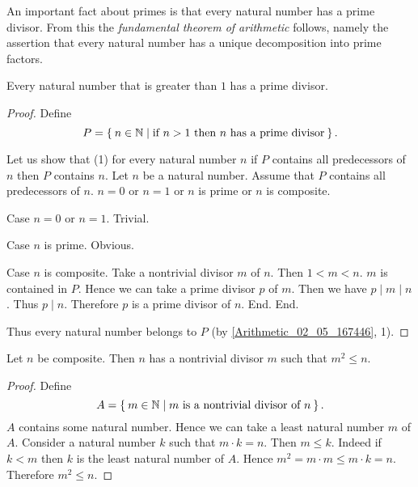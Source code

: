 \documentclass[../../arithmetic.ftl.tex]{subfiles}
\begin{document}
  An important fact about primes is that every natural number has a prime
  divisor. From this the \textit{fundamental theorem of arithmetic} follows,
  namely the assertion that every natural number has a unique decomposition
  into prime factors.

  \begin{forthel}
    \begin{proposition}\label{Arithmetic_03_04_130748}
      Every natural number that is greater than $1$ has a prime divisor.
    \end{proposition}
    \begin{proof}
      Define \[ P = \Set{n \in \mathbb{N} | \text{if $n > 1$ then $n$ has a prime divisor}}. \]

      Let us show that (1) for every natural number $n$ if $P$ contains all predecessors of $n$ then $P$ contains $n$.
        Let $n$ be a natural number.
        Assume that $P$ contains all predecessors of $n$.
        $n = 0$ or $n = 1$ or $n$ is prime or $n$ is composite.

        Case $n = 0$ or $n = 1$. Trivial.

        Case $n$ is prime. Obvious.

        Case $n$ is composite.
          Take a nontrivial divisor $m$ of $n$.
          Then $1 < m < n$.
          $m$ is contained in $P$.
          Hence we can take a prime divisor $p$ of $m$.
          Then we have $p \mid m \mid n$.
          Thus $p \mid n$.
          Therefore $p$ is a prime divisor of $n$.
        End.
      End.

      Thus every natural number belongs to $P$ (by \ref{Arithmetic_02_05_167446}, 1).
    \end{proof}

    \begin{proposition}\label{Arithmetic_03_04_306779}
      Let $n$ be composite.
      Then $n$ has a nontrivial divisor $m$ such that $m^{2} \leq n$.
    \end{proposition}
    \begin{proof}
      Define \[ A = \Set{m \in \mathbb{N} | \text{$m$ is a nontrivial divisor of $n$}}. \]
      $A$ contains some natural number.
      Hence we can take a least natural number $m$ of $A$.
      Consider a natural number $k$ such that $m \cdot k = n$.
      Then $m \leq k$.
      Indeed if $k < m$ then $k$ is the least natural number of $A$.
      Hence $m^{2} = m \cdot m \leq m \cdot k = n$.
      Therefore $m^{2} \leq n$.
    \end{proof}
  \end{forthel}
\end{document}
